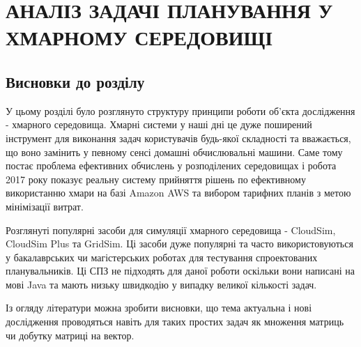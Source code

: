 
\chapter{АНАЛІЗ ЗАДАЧІ ПЛАНУВАННЯ У ХМАРНОМУ СЕРЕДОВИЩІ}







\section*{Висновки до розділу}

У цьому розділі було розглянуто структуру принципи роботи об'єкта дослідження - хмарного середовища. Хмарні системи у наші дні це дуже поширений інструмент для виконання задач користувачів будь-якої складності та вважається, що воно замінить у певному сенсі домашні обчислювальні машини. Саме тому постає проблема ефективних обчислень у розподілених середовищах і робота \cite{PushingTheBoundsOfMatrixMatrix} 2017 року показує реальну систему прийняття рішень по ефективному використанню хмари на базі Amazon AWS та вибором тарифних планів з метою мінімізації витрат.

Розглянуті популярні засоби для симуляції хмарного середовища - CloudSim, CloudSim Plus та GridSim. Ці засоби дуже популярні та часто використовуються у бакалаврських чи магістерських роботах для тестування спроектованих планувальників. Ці СПЗ не підходять для даної роботи оскільки вони написані на мові Java та мають низьку швидкодію у випадку великої кількості задач.

Із огляду літератури можна зробити висновки, що тема актуальна і нові дослідження проводяться навіть для таких простих задач як множення матриць чи добутку матриці на вектор.